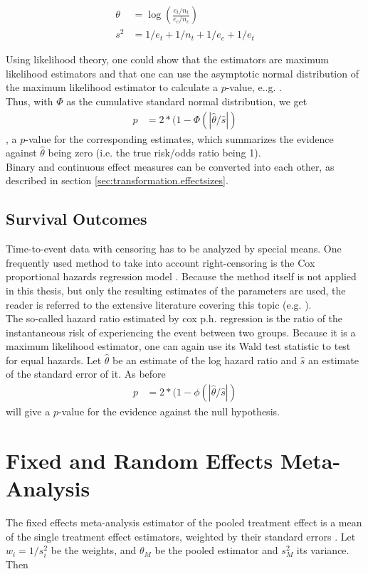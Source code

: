 \begin{align}
\theta &= \log(\frac{e_t/n_t}{e_c/n_c}) \label{eq:risk.ratio} \\
s^2 &= 1/e_t + 1/n_t + 1/e_c + 1/e_t \label{eq:risk.ratio.variance}
\end{align}

Using likelihood theory, one could show that the estimators are maximum likelihood estimators and that one can use the asymptotic normal distribution of the maximum likelihood estimator to calculate a $p$-value, e..g. \cite[98]{held2014}. \\
Thus, with $\Phi$ as the cumulative standard normal distribution, we get
\begin{align}
p &= 2*(1-\Phi(|\hat{\theta}/\hat{s}|) \nonumber
\end{align}
, a $p$-value for the corresponding estimates, which summarizes the evidence against $\hat{\theta}$ being zero (i.e. the true risk/odds ratio being 1). \\
Binary and continuous effect measures can be converted into each other, as described in section \ref{sec:transformation.effectsizes}.

\subsection{Survival Outcomes}
Time-to-event data with censoring has to be analyzed by special means. One frequently used method to take into account right-censoring is the Cox proportional hazards regression model \citep{Cox}. Because the method itself is not applied in this thesis, but only the resulting estimates of the parameters are used, the reader is referred to the extensive literature covering this topic (e.g. \citet{Surv}). \\
The so-called hazard ratio estimated by cox p.h. regression is the ratio of the instantaneous risk of experiencing the event between two groups. Because it is a maximum likelihood estimator, one can again use its Wald test statistic to test for equal hazards. Let $\hat{\theta}$ be an estimate of the log hazard ratio and $\hat{s}$ an estimate of the standard error of it. As before
\begin{align}
p &= 2*(1-\phi(|\hat{\theta}/\hat{s}|) \nonumber
\end{align}
will give a $p$-value for the evidence against the null hypothesis.



\section{Fixed and Random Effects Meta-Analysis} \label{sec:meta.analysis}
The fixed effects meta-analysis estimator of the pooled treatment effect is a mean of the single treatment effect estimators, weighted by their standard errors \citep{fixed.effects.rosenthal}. Let $w_i = 1/s_i^2$ be the weights, and $\theta_M$ be the pooled estimator and $s_M^2$ its variance. Then 

